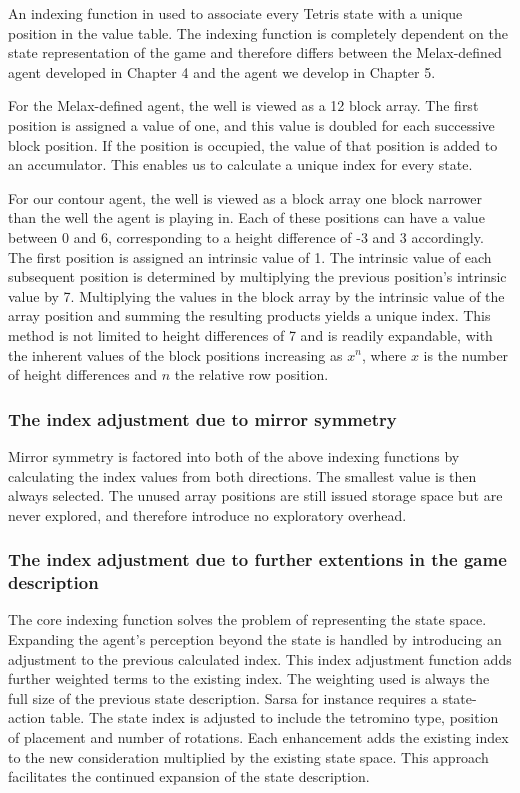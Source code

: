 \documentclass{rucsthesis}
\begin{document}
An indexing function in used to associate every Tetris state with a unique position in the value table. The indexing function is completely dependent on the state representation of the game and therefore differs between the Melax-defined agent developed in Chapter 4 and the agent we develop in Chapter 5.

For the Melax-defined agent, the well is viewed as a 12 block array. The first position is assigned a value of one, and this value is doubled for each successive block position. If the position is occupied, the value of that position is added to an accumulator. This enables us to calculate a unique index for every state.

For our contour agent, the well is viewed as a block array one block narrower than the well the agent is playing in. Each of these positions can have a value between 0 and 6, corresponding to a height difference of -3 and 3 accordingly. The first position is assigned an intrinsic value of 1. The intrinsic value of each subsequent position is determined by multiplying the previous position's intrinsic value by 7. Multiplying the values in the block array by the intrinsic value of the array position and summing the resulting products yields a unique index. This method is not limited to height differences of 7 and is readily expandable, with the inherent values of the block positions increasing as $x^n$, where $x$ is the number of height differences and $n$ the relative row position.

\subsubsection{The index adjustment due to mirror symmetry}

Mirror symmetry is factored into both of the above indexing functions by calculating the index values from both directions. The smallest value is then always selected. The unused array positions are still issued storage space but are never explored, and therefore introduce no exploratory overhead.

\subsubsection{The index adjustment due to further extentions in the game description}

The core indexing function solves the problem of representing the state space. Expanding the agent's perception beyond the state is handled by introducing an adjustment to the previous calculated index. This index adjustment function adds further weighted terms to the existing index. The weighting used is always the full size of the previous state description. Sarsa for instance requires a state-action table. The state index is adjusted to include the tetromino type, position of placement and number of rotations. Each enhancement adds the existing index to the new consideration multiplied by the existing state space. This approach facilitates the continued expansion of the state description.
\end{document}
